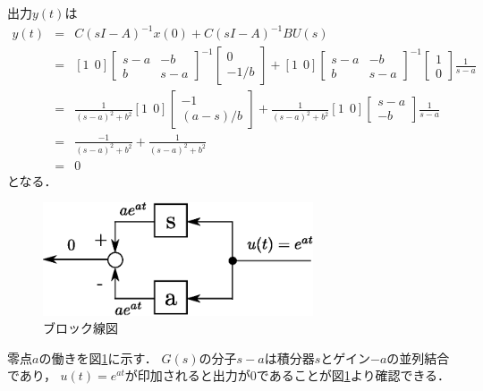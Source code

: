 \documentclass[a4paper,12pt]{jarticle}
\begin{document}
\vspace{-10mm}
\section*{}
出力$y(t)$は
\begin{eqnarray}
 y(t)&=&C(sI-A)^{-1}x(0)+C(sI-A)^{-1}BU(s) \nonumber\\
 &=&\left[1~~0\right]
  \left[
\begin{array}{cc}
 s-a &-b\\
 b &s-a
\end{array}
\right]^{-1}\left[
\begin{array}{c}
 0\\
 -1/b
\end{array}
\right]+\left[1~~0\right]
\left[
\begin{array}{cc}
 s-a &-b\\
 b &s-a
\end{array}
\right]^{-1}\left[
\begin{array}{c}
 1\\
 0
\end{array}
\right]\frac{1}{s-a}
\nonumber\\
 &=&
  \frac{1}{(s-a)^2+b^2}
  \left[1~~0\right]\left[
\begin{array}{c}
-1\\
 (a-s)/b 
\end{array}
\right]+ \frac{1}{(s-a)^2+b^2}\left[1~~0\right]
\left[
\begin{array}{cc}
 s-a\\
 -b 
\end{array}
\right]\frac{1}{s-a}\nonumber\\
 &=& \frac{-1}{(s-a)^2+b^2}+ \frac{1}{(s-a)^2+b^2}\nonumber\\
 &=&0
\end{eqnarray}
となる．
%
\begin{figure}[tbp]
 \begin{center}
  \includegraphics[width=80mm]{fig/burokku.eps}
 \end{center}
 \caption{ブロック線図}
 \label{fig:bro}
\end{figure}
%
零点$a$の働きを図\ref{fig:bro}に示す．
$G(s)$の分子$s-a$は積分器$s$とゲイン$-a$の並列結合であり，
$u(t)=e^{at}$が印加されると出力が$0$であることが図\ref{fig:bro}より確認できる．
\end{document}
